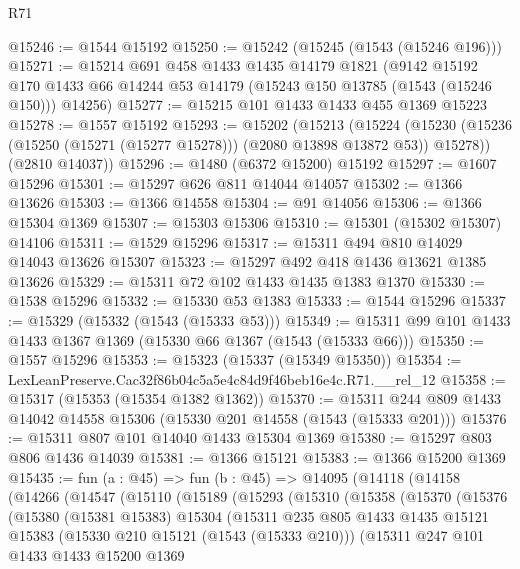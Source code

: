\begin{lexlean}{R71}
\begin{coremodule}
@15246 := @1544 @15192
@15250 := @15242 (@15245 (@1543 (@15246 @196)))
@15271 := @15214
    @691
    @458
    @1433
    @1435
    @14179
    @1821
    (@9142
      @15192
      @170
      @1433
      @66
      @14244
      @53
      @14179
      (@15243 @150 @13785 (@1543 (@15246 @150)))
      @14256)
@15277 := @15215 @101 @1433 @1433 @455 @1369 @15223
@15278 := @1557 @15192
@15293 := @15202
    (@15213
      (@15224 (@15230 (@15236 (@15250 (@15271 (@15277 @15278))) (@2080 @13898 @13872 @53)) @15278))
      (@2810 @14037))
@15296 := @1480 (@6372 @15200) @15192
@15297 := @1607 @15296
@15301 := @15297 @626 @811 @14044 @14057
@15302 := @1366 @13626
@15303 := @1366 @14558
@15304 := @91 @14056
@15306 := @1366 @15304 @1369
@15307 := @15303 @15306
@15310 := @15301 (@15302 @15307) @14106
@15311 := @1529 @15296
@15317 := @15311 @494 @810 @14029 @14043 @13626 @15307
@15323 := @15297 @492 @418 @1436 @13621 @1385 @13626
@15329 := @15311 @72 @102 @1433 @1435 @1383 @1370
@15330 := @1538 @15296
@15332 := @15330 @53 @1383
@15333 := @1544 @15296
@15337 := @15329 (@15332 (@1543 (@15333 @53)))
@15349 := @15311 @99 @101 @1433 @1433 @1367 @1369 (@15330 @66 @1367 (@1543 (@15333 @66)))
@15350 := @1557 @15296
@15353 := @15323 (@15337 (@15349 @15350))
@15354 := LexLeanPreserve.Cac32f86b04c5a5e4c84d9f46beb16e4c.R71.__rel_12
@15358 := @15317 (@15353 (@15354 @1382 @1362))
@15370 := @15311 @244 @809 @1433 @14042 @14558 @15306 (@15330 @201 @14558 (@1543 (@15333 @201)))
@15376 := @15311 @807 @101 @14040 @1433 @15304 @1369
@15380 := @15297 @803 @806 @1436 @14039
@15381 := @1366 @15121
@15383 := @1366 @15200 @1369
@15435 := fun (a : @45) =>
  fun (b : @45) =>
  @14095
    (@14118
      (@14158
        (@14266
          (@14547
            (@15110
              (@15189
                (@15293
                  (@15310
                    (@15358
                      (@15370
                        (@15376
                          (@15380
                            (@15381 @15383)
                            @15304
                            (@15311
                              @235
                              @805
                              @1433
                              @1435
                              @15121
                              @15383
                              (@15330 @210 @15121 (@1543 (@15333 @210)))
                              (@15311
                                @247
                                @101
                                @1433
                                @1433
                                @15200
                                @1369

\end{coremodule}
\end{lexlean}
